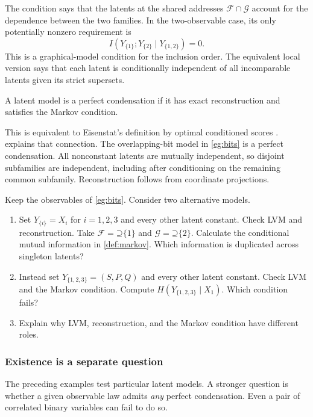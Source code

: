 \documentclass[11pt]{article}
\newcommand{\Up}{\mathord{\supseteq}}
\begin{document}
The condition says that the latents at the shared addresses
$\mathcal{F}\cap\mathcal{G}$ account for the dependence between the two
families. In the two-observable
case, its only potentially nonzero requirement is
\[
 I(Y_{\{1\}};Y_{\{2\}}\mid Y_{\{1,2\}})=0.
\]
This is a graphical-model condition for the inclusion order. The equivalent
local version says that each latent is conditionally independent of all
incomparable latents given its strict supersets.

\begin{definition}
\label{def:perfect}
A latent model is a perfect condensation if it has exact reconstruction
and satisfies the Markov condition.
\end{definition}
This is equivalent to Eisenstat's definition by optimal conditioned scores
\citep[Theorem~5.10]{eisenstat2025condensation}.  explains that connection.
The overlapping-bit model in \cref{eg:bits} is a perfect condensation. All
nonconstant latents are mutually independent, so disjoint subfamilies are
independent, including after conditioning on the remaining common
subfamily. Reconstruction follows from coordinate projections.

\begin{exercise}
\label{ex:failed}\important
Keep the observables of \cref{eg:bits}. Consider two alternative models.
\begin{enumerate}
\item Set $Y_{\{i\}}=X_i$ for $i=1,2,3$ and every other latent constant.
Check LVM and reconstruction. Take
$\mathcal{F}=\Up\{1\}$ and $\mathcal{G}=\Up\{2\}$.
Calculate the conditional mutual information in \cref{def:markov}.
Which information is duplicated across singleton latents?
\item Instead set $Y_{\{1,2,3\}}=(S,P,Q)$ and every other latent constant.
Check LVM and the Markov condition. Compute
$H(Y_{\{1,2,3\}}\mid X_1)$. Which condition fails?
\item Explain why LVM, reconstruction, and the
Markov condition have different roles.
\end{enumerate}
\end{exercise}

\subsubsection{Existence is a separate question}
\label{sec:existence}
The preceding examples test particular latent models. A stronger question is
whether a given observable law admits \emph{any} perfect condensation.
Even a pair of correlated binary variables can fail to do so.
\end{document}
